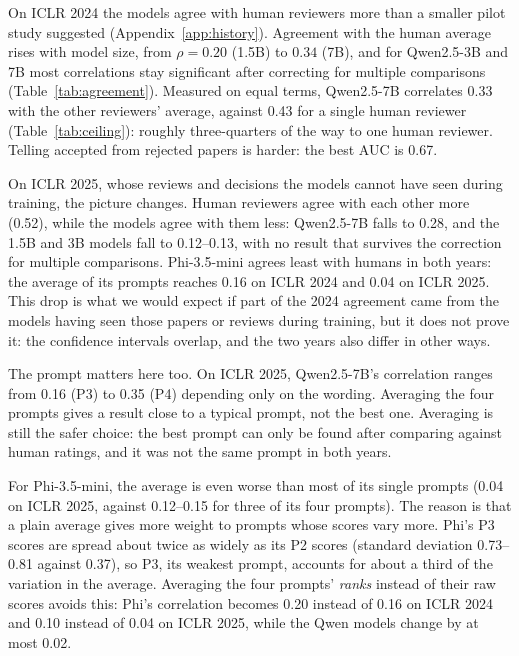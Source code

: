 \documentclass[11pt]{article}
\begin{document}
\begin{table}[!htbp]
\centering

\caption{Equal-terms comparison: Spearman correlation with the average of a paper's \emph{other} reviewers, for a model (average of its four prompts) and for one randomly chosen human reviewer, averaged over random draws.}
\label{tab:ceiling}
\end{table}

On ICLR 2024 the models agree with human reviewers more than a smaller pilot study suggested (Appendix~\ref{app:history}). Agreement with the human average rises with model size, from $\rho = 0.20$ (1.5B) to $0.34$ (7B), and for Qwen2.5-3B and 7B most correlations stay significant after correcting for multiple comparisons (Table~\ref{tab:agreement}). Measured on equal terms, Qwen2.5-7B correlates 0.33 with the other reviewers' average, against 0.43 for a single human reviewer (Table~\ref{tab:ceiling}): roughly three-quarters of the way to one human reviewer. Telling accepted from rejected papers is harder: the best AUC is 0.67.

On ICLR 2025, whose reviews and decisions the models cannot have seen during training, the picture changes. Human reviewers agree with each other more (0.52), while the models agree with them less: Qwen2.5-7B falls to 0.28, and the 1.5B and 3B models fall to 0.12--0.13, with no result that survives the correction for multiple comparisons. Phi-3.5-mini agrees least with humans in both years: the average of its prompts reaches 0.16 on ICLR 2024 and 0.04 on ICLR 2025. This drop is what we would expect if part of the 2024 agreement came from the models having seen those papers or reviews during training, but it does not prove it: the confidence intervals overlap, and the two years also differ in other ways.

The prompt matters here too. On ICLR 2025, Qwen2.5-7B's correlation ranges from 0.16 (P3) to 0.35 (P4) depending only on the wording. Averaging the four prompts gives a result close to a typical prompt, not the best one. Averaging is still the safer choice: the best prompt can only be found after comparing against human ratings, and it was not the same prompt in both years.

For Phi-3.5-mini, the average is even worse than most of its single prompts (0.04 on ICLR 2025, against 0.12--0.15 for three of its four prompts). The reason is that a plain average gives more weight to prompts whose scores vary more. Phi's P3 scores are spread about twice as widely as its P2 scores (standard deviation 0.73--0.81 against 0.37), so P3, its weakest prompt, accounts for about a third of the variation in the average. Averaging the four prompts' \emph{ranks} instead of their raw scores avoids this: Phi's correlation becomes 0.20 instead of 0.16 on ICLR 2024 and 0.10 instead of 0.04 on ICLR 2025, while the Qwen models change by at most 0.02.
\end{document}
